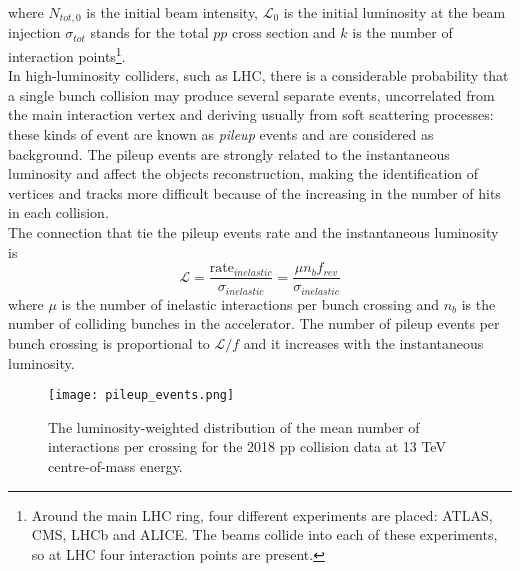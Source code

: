 where $N_{tot,0}$ is the initial beam intensity, $\mathcal{L}_0$ is the initial luminosity at the beam injection $\sigma_{tot}$ stands for the total $pp$ cross section and $k$ is the number of interaction points\footnote{Around the main LHC ring, four different experiments are placed: ATLAS, CMS, LHCb and ALICE. The beams collide into each of these experiments, so at LHC four interaction points are present.}.
\\
In high-luminosity colliders, such as LHC, there is a considerable probability that a single bunch collision may produce several separate events, uncorrelated from the main interaction vertex and deriving usually from soft scattering processes: these kinds of event are known as \emph{pileup} events and are considered as background. The pileup events are strongly related to the instantaneous luminosity and affect the objects reconstruction, making the identification of vertices and tracks more difficult because of the increasing in the number of hits in each collision.
\\
The connection that tie the pileup events rate and the instantaneous luminosity is
\begin{equation}
\mathcal{L} = \frac{\text{rate}_{inelastic}}{\sigma_{inelastic}} = \frac{\mu n_b f_{rev}}{\sigma_{inelastic}}
\end{equation}
where $\mu$ is the number of inelastic interactions per bunch crossing and $n_b$ is the number of colliding bunches in the accelerator. The number of pileup events per bunch crossing is proportional to $\mathcal{L}/f$ and it increases with the instantaneous luminosity.
\begin{figure}[h]
\centering
\texttt{[image: pileup\_events.png]}
\caption{The luminosity-weighted distribution of the mean number of interactions per crossing for the 2018 pp collision data at 13 TeV centre-of-mass energy.}
\end{figure}


